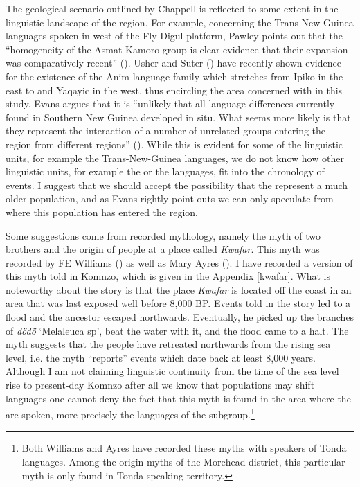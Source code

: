 The geological scenario outlined by Chappell is reflected to some extent in the linguistic landscape of the region. For example, concerning the Trans-New-Guinea languages spoken in west of the Fly-Digul platform, Pawley points out that the ``homogeneity of the Asmat-Kamoro group is clear evidence that their expansion was comparatively recent'' (\citeyear[10]{Pawley:2005intro}). Usher and Suter (\citeyear{Usher:2015kr}) have recently shown evidence for the existence of the Anim language family which stretches from Ipiko in the east to  and Yaqayic in the west, thus encircling the area concerned with in this study. Evans argues that it is ``unlikely that all language differences currently found in Southern New Guinea developed in situ. What seems more likely is that they represent the interaction of a number of unrelated groups entering the region from different regions'' (\citeyear[111]{Evans:2012wp}). While this is evident for some of the linguistic units, for example the Trans-New-Guinea languages, we do not know how other linguistic units, for example the  or the  languages, fit into the chronology of events. I suggest that we should accept the possibility that the  represent a much older population, and {\textendash} as Evans rightly point outs {\textendash} we can only speculate from where this population has entered the region.%

Some suggestions come from recorded mythology, namely the myth of two brothers and the origin of people at a place called \emph{Kwafar}. This myth was recorded by FE Williams (\citeyear[306]{Williams:1936transfly}) as well as Mary Ayres (\citeyear[50]{Ayres:ws}). I have recorded a version of this myth told in Komnzo, which is given in the Appendix \ref{kwafar}. What is noteworthy about the story is that the place \emph{Kwafar} is located off the coast in an area that was last exposed well before 8,000 BP. Events told in the story led to a flood and the  ancestor escaped northwards. Eventually, he picked up the branches of \emph{dödö} `Melaleuca sp', beat the water with it, and the flood came to a halt. The myth suggests that the people have retreated northwards from the rising sea level, i.e. the myth ``reports'' events which date back at least 8,000 years. Although I am not claiming linguistic continuity from the time of the sea level rise to present-day Komnzo {\textendash} after all we know that populations may shift languages {\textendash} one cannot deny the fact that this myth is found in the area where the  are spoken, more precisely the languages of the  subgroup.\footnote{Both Williams and Ayres have recorded these myths with speakers of Tonda languages. Among the origin myths of the Morehead district, this particular myth is only found in Tonda speaking territory.}

